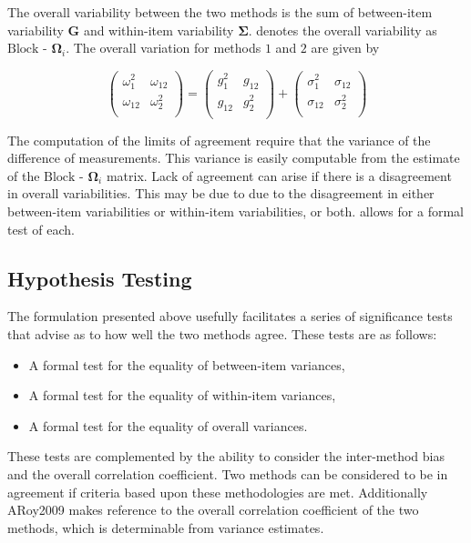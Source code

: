 \documentclass[12pt, a4paper]{report}
\theoremstyle{plain}
\theoremstyle{definition}
\theoremstyle{remark}
\begin{document}
	\newpage
	
	
	
	
	
	The overall variability between
	the two methods is the sum of between-item variability
	$\boldsymbol{G}$ and within-item variability
	$\boldsymbol{\Sigma}$. \citet{ARoy2009} denotes the overall variability
	as ${\mbox{Block - }\boldsymbol \Omega_{i}}$. The overall
	variation for methods $1$ and $2$ are given by
	
	\begin{center}
		\[\left(\begin{array}{cc}
		\omega^2_1  & \omega_{12} \\
		\omega_{12} & \omega^2_2 \\
		\end{array}  \right)
		=  \left(
		\begin{array}{cc}
		g^2_1  & g_{12} \\
		g_{12} & g^2_2 \\
		\end{array} \right)+
		\left(
		\begin{array}{cc}
		\sigma^2_1  & \sigma_{12} \\
		\sigma_{12} & \sigma^2_2 \\
		\end{array}\right)
		\]
	\end{center}
	The computation of the limits of agreement require that the variance of the difference of measurements. This variance is easily computable from the estimate of the ${\mbox{Block - }\boldsymbol \Omega_{i}}$ matrix. Lack of agreement can arise if there is a disagreement in overall variabilities. This may be due to due to the disagreement in either between-item
	variabilities or within-item variabilities, or both. \citet{ARoy2009} allows for a formal test of each.
	
	\subsection{Hypothesis Testing}
	The formulation presented above usefully facilitates a series of
	significance tests that advise as to how well the two methods
	agree. These tests are as follows:
	\begin{itemize}
		\item A formal test for the equality of between-item variances,
		\item A formal test for the equality of within-item variances,
		\item A formal test for the equality of overall variances.
	\end{itemize}
	These tests are complemented by the ability to consider the inter-method bias and the overall correlation coefficient. Two methods can be considered to be in agreement if criteria based upon these methodologies are met. Additionally ARoy2009 makes reference to the overall correlation coefficient of the two methods, which is determinable from variance estimates.
	
\end{document}
